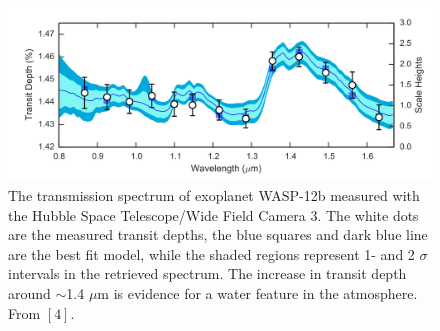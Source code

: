 \documentclass[12pt, letterpaper]{article}
\begin{document}
\begin{figure}[h!]
\centering
\vspace{-0.2in}
\includegraphics[width=\textwidth]{water_spectrum}
\vspace{-0.2in}
\caption{The transmission spectrum of exoplanet WASP-12b measured with the Hubble Space Telescope/Wide Field Camera 3. The white dots are the measured transit depths, the blue squares and dark blue line are the best fit model, while the shaded regions represent 1- and 2 $\sigma$ intervals in the retrieved spectrum. The increase in transit depth around $\sim$1.4 $\mu$m is evidence for a water feature in the atmosphere. From $[4]$.}
\label{fig:HLTau}
\end{figure}


\end{document}
